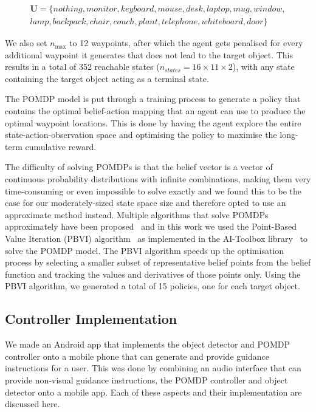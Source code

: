 \documentclass[runningheads]{llncs}
\begin{document}
\begin{equation}
  \begin{split}
    \mathbf{U} = \{ nothing, monitor, keyboard, mouse, desk, laptop, mug, window,\\ 
      lamp, backpack, chair, couch, plant, telephone, whiteboard, door \}
  \end{split}
\end{equation}

We also set $n_{\max}$ to 12 waypoints, after which the agent gets penalised for every additional waypoint it generates that does not lead to the target object. 
This results in a total of 352 reachable states ($n_{states} = 16\times11\times2$), with any state containing the target object acting as a terminal state.

The POMDP model is put through a training process to generate a policy that contains the optimal belief-action mapping that an agent can use to produce the optimal waypoint locations.
This is done by having the agent explore the entire state-action-observation space and optimising the policy to maximise the long-term cumulative reward.

The difficulty of solving POMDPs is that the belief vector is a vector of continuous probability distributions with infinite combinations, making them very time-consuming or even impossible to solve exactly and we found this to be the case for our moderately-sized state space size and therefore opted to use an approximate method instead.
Multiple algorithms that solve POMDPs approximately have been proposed~\cite{bargiacchi2016dynamic,kaelbling1998planning,silver2010monte,spaan2005perseus} and in this work we used the Point-Based Value Iteration (PBVI) algorithm~\cite{pineau2003point} as implemented in the AI-Toolbox library~\cite{aitoolbox} to solve the POMDP model.
The PBVI algorithm speeds up the optimisation process by selecting a smaller subset of representative belief points from the belief function and tracking the values and derivatives of those points only. 
Using the PBVI algorithm, we generated a total of 15 policies, one for each target object. 

\subsection{Controller Implementation}

We made an Android app that implements the object detector and POMDP controller onto a mobile phone that can generate and provide guidance instructions for a user.  
This was done by combining an audio interface that can provide non-visual guidance instructions, the POMDP controller and object detector onto a mobile app.
Each of these aspects and their implementation are discussed here.
\end{document}
